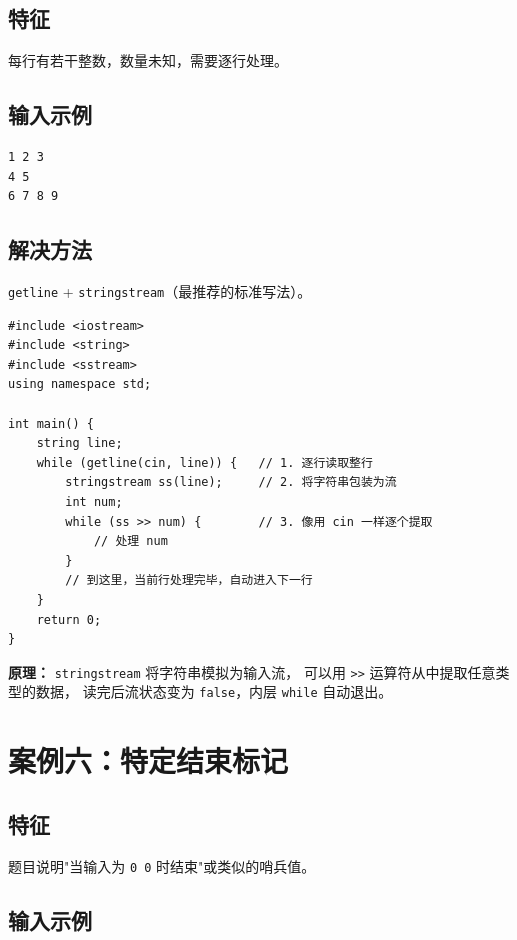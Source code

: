 \documentclass[12pt, a4paper]{article}
\begin{document}
\subsection{特征}

每行有若干整数，数量未知，需要逐行处理。

\subsection{输入示例}

\begin{lstlisting}[style=input]
1 2 3
4 5
6 7 8 9
\end{lstlisting}

\subsection{解决方法}

\texttt{getline} + \texttt{stringstream}（最推荐的标准写法）。

\begin{lstlisting}[style=cpp]
#include <iostream>
#include <string>
#include <sstream>
using namespace std;

int main() {
    string line;
    while (getline(cin, line)) {   // 1. 逐行读取整行
        stringstream ss(line);     // 2. 将字符串包装为流
        int num;
        while (ss >> num) {        // 3. 像用 cin 一样逐个提取
            // 处理 num
        }
        // 到这里，当前行处理完毕，自动进入下一行
    }
    return 0;
}
\end{lstlisting}

\textbf{原理：} \texttt{stringstream} 将字符串模拟为输入流，
可以用 \texttt{>>} 运算符从中提取任意类型的数据，
读完后流状态变为 \texttt{false}，内层 \texttt{while} 自动退出。

\section{案例六：特定结束标记}

\subsection{特征}

题目说明"当输入为 \texttt{0 0} 时结束"或类似的哨兵值。

\subsection{输入示例}
\end{document}
